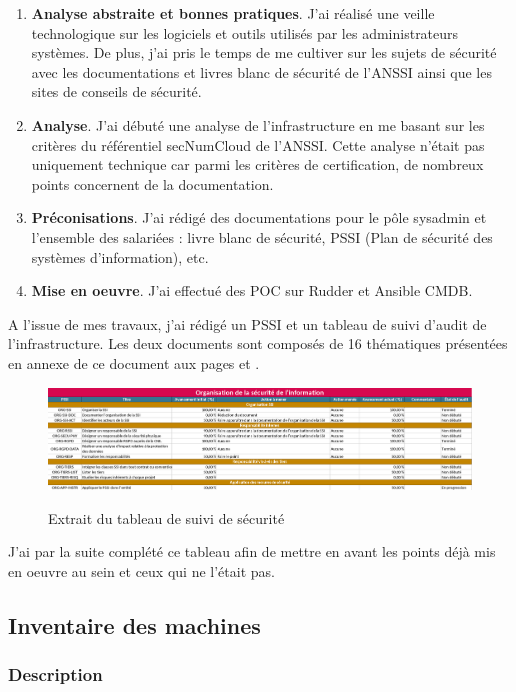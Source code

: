 \documentclass[12pt]{article}
\begin{document}
\begin{enumerate}
    \item \textbf{Analyse abstraite et bonnes pratiques}. J'ai réalisé une veille technologique sur les logiciels et outils utilisés par les administrateurs systèmes. 
    De plus, j'ai pris le temps de me cultiver sur les sujets de sécurité avec les documentations et livres blanc de sécurité de l'ANSSI ainsi que les sites de conseils de sécurité.
    \item \textbf{Analyse}. J'ai débuté une analyse de l'infrastructure en me basant sur les critères du référentiel secNumCloud de l'ANSSI. 
    Cette analyse n'était pas uniquement technique car parmi les critères de certification, de nombreux points concernent de la documentation.
    \item \textbf{Préconisations}. J'ai rédigé des documentations pour le pôle \gls{sysadmin} et l'ensemble des salariées : livre blanc de sécurité, PSSI (Plan de sécurité des systèmes d'information), etc.
    \item \textbf{Mise en oeuvre}. J'ai effectué des \gls{POC} sur Rudder et Ansible CMDB.
\end{enumerate}

A l'issue de mes travaux, j'ai rédigé un PSSI et un tableau de suivi d'audit de l'infrastructure. 
Les deux documents sont composés de 16 thématiques présentées en annexe de ce document aux pages \pageref{tab:16thematiques1} et \pageref{tab:16thematiques2}.
\begin{figure}[!ht]
    \centering
    \includegraphics[width=\textwidth]{src/table_example.png}
    \label{fig:pssi_table}
    \caption{Extrait du tableau de suivi de sécurité}
\end{figure}

J'ai par la suite complété ce tableau afin de mettre en avant les points déjà mis en oeuvre au sein et ceux qui ne l'était pas.

\newpage
\subsection{Inventaire des machines}
\subsubsection{Description}
\end{document}

